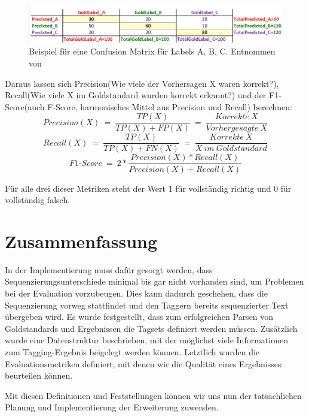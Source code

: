 \begin{figure}[htb]
	\includegraphics[width=\textwidth]{gfx/multi-class-confusionmatrix.png}
	\caption{Beispiel für eine Confusion Matrix für Labels A, B, C. Entnommen von \cite{Web:rxnlp}}
	\label{fig:intro:pos:metrics:confusion}
\end{figure}

Daraus lassen sich Precision(Wie viele der Vorhersagen X waren korrekt?), Recall(Wie viele X im Goldstandard wurden korrekt erkannt?) und der F1-Score(auch F-Score, harmonisches Mittel aus Precision und Recall) berechnen:
\[ Precision(X) \: = \: \frac{TP(X)}{TP(X)+FP(X)}\: = \: \frac{Korrekte\:X}{Vorhergesagte\:X} \]
\[ Recall(X) \: = \: \frac{TP(X)}{TP(X)+FN(X)} \: = \: \frac{Korrekte\:X}{X\:im\:Goldstandard} \]
\[ F1\mbox{-}Score \: = \: 2*\frac{Precision(X)*Recall(X)}{Precision(X)+Recall(X)} \]

Für alle drei dieser Metriken steht der Wert 1 für vollständig richtig und 0 für vollständig falsch.


\section{Zusammenfassung}
\label{sec:concept:conclusion}

In der Implementierung muss dafür gesorgt werden, dass Sequenzierungsunterschiede minimal bis gar nicht vorhanden sind, um Problemen bei der Evaluation vorzubeugen. Dies kann dadurch geschehen, dass die Sequenzierung vorweg stattfindet und den Taggern bereits sequenzierter Text übergeben wird. Es wurde festgestellt, dass zum erfolgreichen Parsen von Goldstandards und Ergebnissen die Tagsets definiert werden müssen. Zusätzlich wurde eine Datenstruktur beschrieben, mit der möglichst viele Informationen zum Tagging-Ergebnis beigelegt werden können. Letztlich wurden die Evaluationsmetriken definiert, mit denen wir die Qualität eines Ergebnisses beurteilen können.

Mit diesen Definitionen und Feststellungen können wir uns nun der tatsächlichen Planung und Implementierung der Erweiterung zuwenden.

